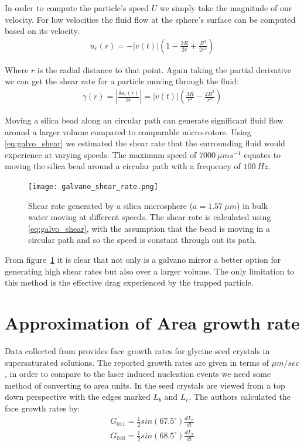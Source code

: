 \documentclass[a4paper,oneside,11pt]{book}
\begin{document}
In order to compute the particle's speed $U$ we simply take the 
magnitude of our velocity. For low velocities the fluid flow at 
the sphere's surface can be computed based on its velocity.
\begin{align}
	u_r(r)=-|v(t)|\left(1-\frac{3R}{2r}+\frac{R^3}{2r^3}\right)
\end{align}

Where $r$ is the radial distance to that point. Again taking the partial 
derivative we can get the shear rate for a particle moving through the fluid:
\begin{align}
	\dot{\gamma}(r) = \left| \frac{\delta u_r(r)}{\delta r}\right| = |v(t)|\left(\frac{3R}{r^2} -\frac{2R^3}{r^4} \right)
	\label{eq:galvo_shear}
\end{align}

Moving a silica bead along an circular path can generate significant fluid 
flow around a larger volume compared to comparable micro-rotors. Using 
\eqref{eq:galvo_shear} we estimated the shear rate that the surrounding fluid 
would experience at varying speeds. The maximum speed of $7000\ \mu m s^{-1}$
equates to moving the silica bead around a circular path with a frequency of 
$100\ Hz$.
\begin{figure}[h!]
	\centering
	\texttt{[image: galvano\_shear\_rate.png]}
	\caption{Shear rate generated by a silica microsphere ($a = 1.57\ \mu m$) 
		in bulk water moving at different speeds. The shear rate is calculated 
		using \eqref{eq:galvo_shear}, with the assumption that the bead is moving
		in a circular path and so the speed is constant through out its path.}
	\label{fig:galvano_shear}
\end{figure}

From figure~\ref{fig:galvano_shear} it is clear that not only is a galvano 
mirror a better option for generating high shear rates but also over a larger 
volume. The only limitation to this method is the effective drag experienced 
by the trapped particle. 
\newpage

\section{Approximation of Area growth rate}
\label{sec.growth_rate_calcs}
Data collected from \cite{Li1992} provides face growth rates 
for glycine seed crystals in supersaturated solutions. The 
reported growth rates are given in terms of $\mu m/sec$, in 
order to compare to the laser induced nucleation events we 
need some method of converting to area units. In \cite{Li1992}
the seed crystals are viewed from a top down perspective with
the edges marked $L_b$ and $L_c$. The authors calculated the 
face growth rates by:
\begin{align}
	G_{011} = \frac{1}{2}sin(67.5^\circ)\frac{dL_c}{dt} \\
	G_{010} = \frac{1}{2}sin(68.5^\circ)\frac{dL_b}{dt}
\end{align}
\end{document}
